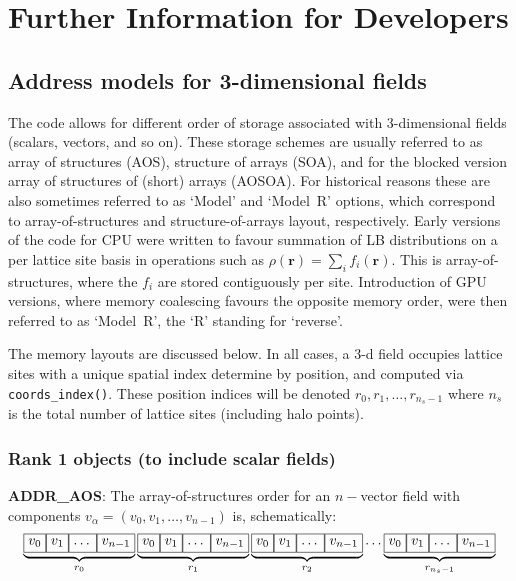%
%
%
%
%
%

\section{Further Information for Developers}

\subsection{Address models for 3-dimensional fields}

The code allows for different order of storage associated with 3-dimensional
fields (scalars, vectors, and so on). These storage schemes are usually
referred to as array of structures (AOS), structure of arrays (SOA), and
for the blocked version array of structures of (short) arrays (AOSOA).
For historical reasons these are
also sometimes referred to as `Model' and `Model~R' options, which correspond
to array-of-structures and structure-of-arrays layout, respectively. Early
versions of the code for CPU were written to favour summation of LB
distributions on a per lattice site basis in operations such as
$\rho(\mathbf{r}) = \sum_i f_i(\mathbf{r})$. This is array-of-structures,
where the $f_i$ are stored contiguously per site. Introduction of GPU
versions, where memory coalescing favours the opposite memory order,
were then referred to as `Model~R', the `R' standing for `reverse'.

The memory layouts are discussed below. In all cases, a 3-d field occupies
lattice sites with a unique spatial index determine by position, and
computed via \texttt{coords\_index()}. These position indices will be denoted
$r_0, r_1, \ldots, r_{n_s-1}$ where $n_s$ is the total number of lattice
sites (including halo points).

\subsubsection{Rank 1 objects (to include scalar fields)}
\label{subsection:addressing-model-rank1}

\textbf{ADDR\_AOS}: The array-of-structures order for an
$n-$vector field
with components $ v_\alpha = (v_0, v_1, \ldots, v_{n-1})$ is, schematically:
\[
\underbrace{ \boxed{v_0\vphantom{v_{n-1}}} \boxed{v_1\vphantom{v_{n-1}}}
\boxed{\ldots\vphantom{v_{n-1}}} \boxed{v_{n-1}} }_{r_0}
\underbrace{ \boxed{v_0\vphantom{v_{n-1}}} \boxed{v_1\vphantom{v_{n-1}}}
\boxed{\ldots\vphantom{v_{n-1}}} \boxed{v_{n-1}} }_{r_1}
\underbrace{ \boxed{v_0\vphantom{v_{n-1}}} \boxed{v_1\vphantom{v_{n-1}}}
\boxed{\ldots\vphantom{v_{n-1}}} \boxed{v_{n-1}} }_{r_2} \ldots
\underbrace{ \boxed{v_0\vphantom{v_{n-1}}} \boxed{v_1\vphantom{v_{n-1}}}
\boxed{\ldots\vphantom{v_{n-1}}} \boxed{v_{n-1}} }_{r_{n_s-1}}
\]

